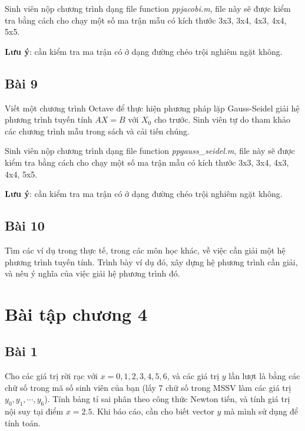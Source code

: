 \documentclass[12pt]{article}
\begin{document}
Sinh viên nộp chương trình dạng file function \emph{ppjacobi.m}, file này sẽ được kiểm tra bằng cách cho chạy một số ma trận mẫu có kích thước 3x3, 3x4, 4x3, 4x4, 5x5.

\textbf{Lưu ý}: cần kiểm tra ma trận có ở dạng đường chéo trội nghiêm ngặt không.

\subsection{Bài 9}
Viết một chương trình Octave để thực hiện phương pháp lặp Gauss-Seidel giải hệ phương trình tuyến tính $AX=B$ với $X_0$ cho trước. Sinh viên tự do tham khảo các chương trình mẫu trong sách và cải tiến chúng.

Sinh viên nộp chương trình dạng file function \emph{ppgauss\_seidel.m}, file này sẽ được kiểm tra bằng cách cho chạy một số ma trận mẫu có kích thước 3x3, 3x4, 4x3, 4x4, 5x5.

\textbf{Lưu ý}: cần kiểm tra ma trận có ở dạng đường chéo trội nghiêm ngặt không.

\subsection{Bài 10}
Tìm các ví dụ trong thực tế, trong các môn học khác, về việc cần giải một hệ phương trình tuyến tính. Trình bày ví dụ đó, xây dựng hệ phương trình cần giải, và nêu ý nghĩa của việc giải hệ phương trình đó.

\section{Bài tập chương 4}

\subsection{Bài 1}

% 

Cho các giá trị rời rạc với $x = 0,1,2,3,4,5,6$, và các giá trị $y$ lần lượt là bằng các chữ số trong mã số sinh viên của bạn (lấy 7 chữ số trong MSSV làm các giá trị $y_0, y_1, \cdots, y_6$). Tính bảng tỉ sai phân theo công thức Newton tiến, và tính giá trị nội suy tại điểm $x=2.5$. Khi báo cáo, cần cho biết vector $y$ mà mình sử dụng để tính toán.
\end{document}
